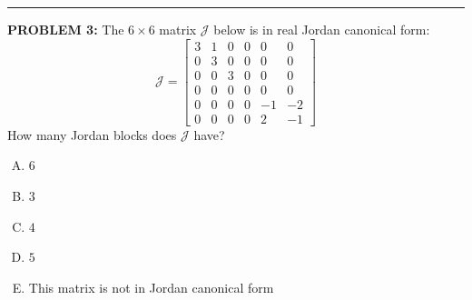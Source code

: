 \documentclass[12pt]{amsart}
\newcommand{\divider}{
  \vspace{-1em} %
  \noindent
  \raisebox{-0.15ex}{\textbullet}%
  \hspace{0.5em}%
  \rule[0.5ex]{0.95\textwidth}{1.0pt}%
  \hspace{0.5em}%
  \raisebox{-0.15ex}{\textbullet}%
  \vspace{0em} %
}
\begin{document}
\divider

{\bf PROBLEM 3:}
%
The $6 \times 6$ matrix ${\mathcal J}$ below is in real Jordan canonical form:
$${\mathcal J} = \begin{bmatrix} 
3 & 1 & 0 & 0 & 0 & 0 \\ 
0 & 3 & 0 & 0 & 0 & 0 \\ 
0 & 0 & 3 & 0 & 0 & 0 \\ 
0 & 0 & 0 & 0 & 0 & 0 \\ 
0 & 0 & 0 & 0 & -1 & -2 \\ 
0 & 0 & 0 & 0 & 2 & -1 
\end{bmatrix}$$
How many Jordan blocks does ${\mathcal J}$ have?
\begin{enumerate}[(A)]
\item $6$
\item $3$
\item $4$
\item $5$
\item This matrix is not in Jordan canonical form
\end{enumerate}
%
\end{document}

